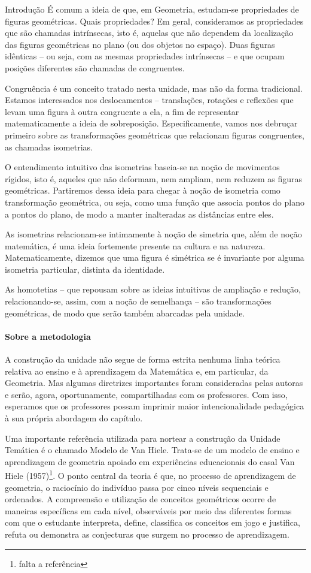 \begin{apresentacao}{Introdução}
É comum a ideia de que, em Geometria, estudam-se propriedades de figuras geométricas. Quais propriedades? Em geral, consideramos as propriedades que são chamadas intrínsecas, isto é, aquelas que não dependem da localização das figuras geométricas no plano (ou dos objetos no espaço).  Duas figuras idênticas – ou seja, com as mesmas propriedades intrínsecas – e que ocupam posições diferentes são chamadas de congruentes. 

Congruência é um conceito tratado nesta unidade, mas não da forma tradicional. Estamos interessados nos deslocamentos – translações, rotações e reflexões que levam uma figura à outra congruente a ela, a fim de representar matematicamente a ideia de sobreposição. Especificamente, vamos nos debruçar primeiro sobre as transformações geométricas que relacionam figuras congruentes, as chamadas isometrias. 

O entendimento intuitivo das isometrias baseia-se na noção de movimentos rígidos, isto é, aqueles que não deformam, nem ampliam, nem reduzem as figuras geométricas. Partiremos dessa ideia para chegar à noção de isometria como transformação geométrica, ou seja, como uma função que associa pontos do plano a pontos do plano, de modo a manter inalteradas as distâncias entre eles. 

As isometrias relacionam-se intimamente à noção de simetria que, além de noção matemática, é uma ideia fortemente presente na cultura e na natureza. Matematicamente, dizemos que uma figura é simétrica se é invariante por alguma isometria particular, distinta da identidade.

As homotetias – que repousam sobre as ideias intuitivas de ampliação e redução, relacionando-se, assim, com a noção de semelhança – são transformações geométricas, de modo que serão também abarcadas pela unidade. 

\paragraph{Sobre a metodologia}
A construção da unidade não segue de forma estrita nenhuma linha teórica relativa ao ensino e à aprendizagem da Matemática e, em particular, da Geometria. Mas algumas diretrizes importantes foram consideradas pelas autoras e serão, agora, oportunamente, compartilhadas com os professores. Com isso, esperamos que os professores possam imprimir maior intencionalidade pedagógica à sua própria abordagem do capítulo.

Uma importante referência utilizada para nortear a construção da Unidade Temática é o chamado Modelo de Van Hiele. Trata-se de um modelo de ensino e aprendizagem de geometria apoiado em experiências educacionais do casal Van Hiele (1957)\footnote{falta a referência}.  O ponto central da teoria é que, no processo de aprendizagem de geometria, o raciocínio do indivíduo passa por cinco níveis sequenciais e ordenados. A compreensão e utilização de conceitos geométricos ocorre de maneiras específicas em cada nível, observáveis por meio das diferentes formas com que o estudante interpreta, define, classifica os conceitos em jogo e justifica, refuta ou demonstra as conjecturas que surgem no processo de aprendizagem.   


\end{apresentacao}
